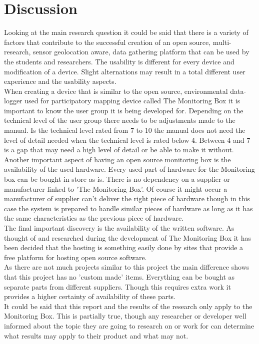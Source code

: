 \documentclass[conference]{IEEEtran}
\begin{document}
\section{Discussion}
	Looking at the main research question it could be said that there is a variety of factors that contribute to the successful creation of an open source, multi-research, sensor geolocation aware, data gathering platform that can be used by the students and researchers. The usability is different for every device and modification of a device. Slight alternations may result in a total different user experience and the usability aspects. \\
	When creating a device that is similar to the open source, environmental data-logger used for participatory mapping device called The Monitoring Box it is important to know the user group it is being developed for. Depending on the technical level of the user group there needs to be adjustments made to the manual. Is the technical level rated from 7 to 10 the manual does not need the level of detail needed when the technical level is rated below 4. Between 4 and 7 is a gap that may need a high level of detail or be able to make it without.\\
	Another important aspect of having an open source monitoring box is the availability of the used hardware. Every used part of hardware for the Monitoring box can be bought in store as-is. There is no dependency on a supplier or manufacturer linked to 'The Monitoring Box'. Of course it might occur a manufacturer of supplier can't deliver the right piece of hardware though in this case the system is prepared to handle similar pieces of hardware as long as it has the same characteristics as the previous piece of hardware. \\
	The final important discovery is the availability of the written software. As thought of and researched during the development of The Monitoring Box it has been decided that the hosting is something easily done by sites that provide a free platform for hosting open source software.\\	
	As there are not much projects similar to this project the main difference shows that this project has no 'custom made' items. Everything can be bought as separate parts from different suppliers. Though this requires extra work it provides a higher certainty of availability of these parts. \\
	It could be said that this report and the results of the research only apply to the Monitoring Box. This is partially true, though any researcher or developer well informed about the topic they are going to research on or work for can determine what results may apply to their product and what may not.
\end{document}
